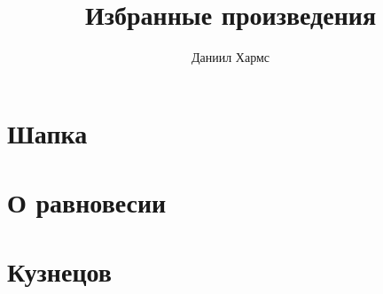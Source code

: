\documentclass[oneside]{book}
\begin{document}
\author{Даниил Хармс}
\date{}
\title{Избранные произведения}
\maketitle

\chapter*{Шапка}



\chapter*{О равновесии}


					  
\chapter*{Кузнецов}


\end{document}
